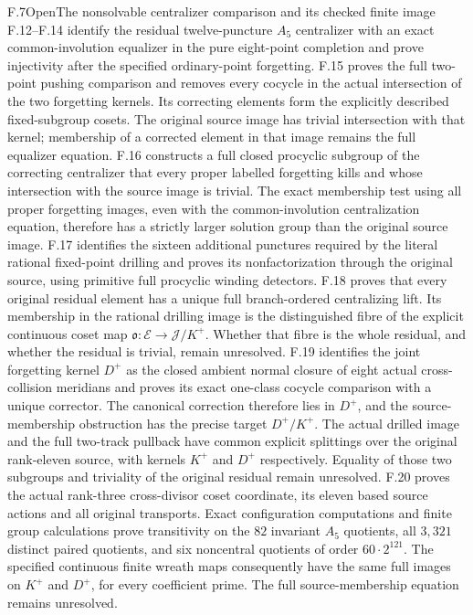 \begin{claim}{F.7}{Open}{The nonsolvable centralizer comparison and its checked finite image}
F.12--F.14 identify the residual twelve-puncture $A_5$ centralizer with an exact common-involution equalizer in the pure eight-point completion and prove injectivity after the specified ordinary-point forgetting. F.15 proves the full two-point pushing comparison and removes every cocycle in the actual intersection of the two forgetting kernels. Its correcting elements form the explicitly described fixed-subgroup cosets. The original source image has trivial intersection with that kernel; membership of a corrected element in that image remains the full equalizer equation. F.16 constructs a full closed procyclic subgroup of the correcting centralizer that every proper labelled forgetting kills and whose intersection with the source image is trivial. The exact membership test using all proper forgetting images, even with the common-involution centralization equation, therefore has a strictly larger solution group than the original source image. F.17 identifies the sixteen additional punctures required by the literal rational fixed-point drilling and proves its nonfactorization through the original source, using primitive full procyclic winding detectors. F.18 proves that every original residual element has a unique full branch-ordered centralizing lift. Its membership in the rational drilling image is the distinguished fibre of the explicit continuous coset map $\mathfrak o:\mathcal E\to\mathcal J/K^+$. Whether that fibre is the whole residual, and whether the residual is trivial, remain unresolved.
F.19 identifies the joint forgetting kernel $D^+$ as the closed ambient normal closure of eight actual cross-collision meridians and proves its exact one-class cocycle comparison with a unique corrector. The canonical correction therefore lies in $D^+$, and the source-membership obstruction has the precise target $D^+/K^+$. The actual drilled image and the full two-track pullback have common explicit splittings over the original rank-eleven source, with kernels $K^+$ and $D^+$ respectively. Equality of those two subgroups and triviality of the original residual remain unresolved.
F.20 proves the actual rank-three cross-divisor coset coordinate, its eleven based source actions and all original transports. Exact configuration computations and finite group calculations prove transitivity on the $82$ invariant $A_5$ quotients, all $3,321$ distinct paired quotients, and six noncentral quotients of order $60\cdot2^{121}$. The specified continuous finite wreath maps consequently have the same full images on $K^+$ and $D^+$, for every coefficient prime. The full source-membership equation remains unresolved.

\end{claim}
